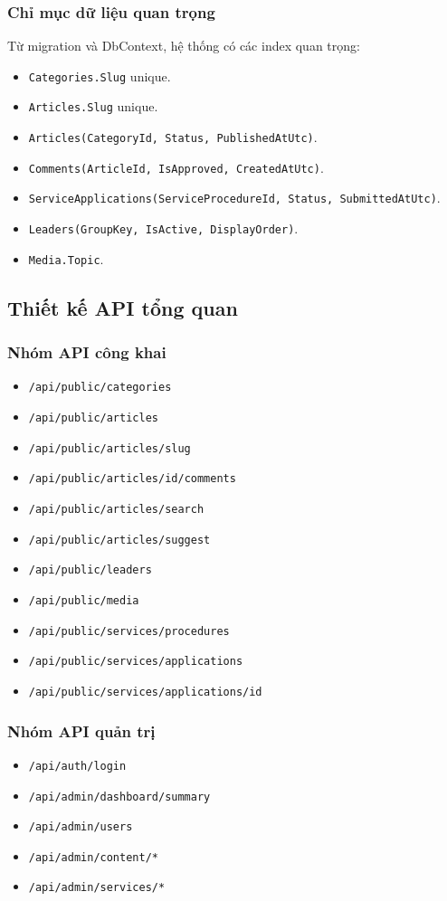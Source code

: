 \documentclass[12pt,a4paper]{article}
\begin{document}
\subsubsection{Chỉ mục dữ liệu quan trọng}
Từ migration và DbContext, hệ thống có các index quan trọng:
\begin{itemize}[leftmargin=1.1cm]
  \item \texttt{Categories.Slug} unique.
  \item \texttt{Articles.Slug} unique.
  \item \texttt{Articles(CategoryId, Status, PublishedAtUtc)}.
  \item \texttt{Comments(ArticleId, IsApproved, CreatedAtUtc)}.
  \item \texttt{ServiceApplications(ServiceProcedureId, Status, SubmittedAtUtc)}.
  \item \texttt{Leaders(GroupKey, IsActive, DisplayOrder)}.
  \item \texttt{Media.Topic}.
\end{itemize}

\subsection{Thiết kế API tổng quan}
\subsubsection{Nhóm API công khai}
\begin{itemize}[leftmargin=1.1cm]
  \item \texttt{/api/public/categories}
  \item \texttt{/api/public/articles}
  \item \texttt{/api/public/articles/{slug}}
  \item \texttt{/api/public/articles/{id}/comments}
  \item \texttt{/api/public/articles/search}
  \item \texttt{/api/public/articles/suggest}
  \item \texttt{/api/public/leaders}
  \item \texttt{/api/public/media}
  \item \texttt{/api/public/services/procedures}
  \item \texttt{/api/public/services/applications}
  \item \texttt{/api/public/services/applications/{id}}
\end{itemize}

\subsubsection{Nhóm API quản trị}
\begin{itemize}[leftmargin=1.1cm]
  \item \texttt{/api/auth/login}
  \item \texttt{/api/admin/dashboard/summary}
  \item \texttt{/api/admin/users}
  \item \texttt{/api/admin/content/*}
  \item \texttt{/api/admin/services/*}
\end{itemize}
\end{document}
